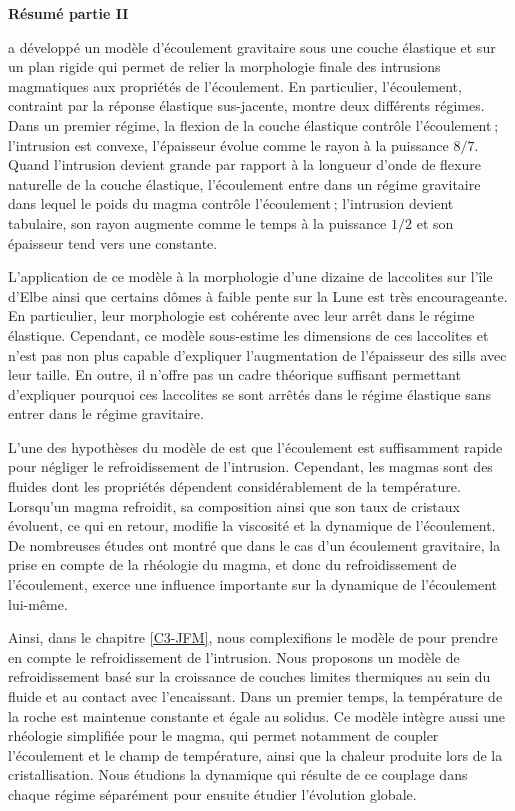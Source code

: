 \thispagestyle{plain}
\begin{flushleft}
 \Large \vspace{.5cm} \textbf{Résumé partie II}
\end{flushleft}

\citet{Michaut:2011kg} a développé un modèle d’écoulement gravitaire
sous une couche élastique et sur un plan rigide qui permet de relier
la morphologie finale des intrusions magmatiques aux propriétés de
l’écoulement. En particulier, l’écoulement, contraint par la réponse
élastique sus-jacente, montre deux différents régimes. Dans un premier
régime, la flexion de la couche élastique contrôle l’écoulement ;
l’intrusion est convexe, l’épaisseur évolue comme le rayon à la
puissance $8/7$. Quand l’intrusion devient grande par rapport à la
longueur d’onde de flexure naturelle de la couche élastique,
l’écoulement entre dans un régime gravitaire dans lequel le poids du
magma contrôle l’écoulement ; l’intrusion devient tabulaire, son rayon
augmente comme le temps à la puissance $1/2$ et son épaisseur tend
vers une constante.

L’application  de  ce  modèle  à   la  morphologie  d’une  dizaine  de
laccolites sur  l’île d’Elbe ainsi  que certains dômes à  faible pente
sur la Lune  est très encourageante. En  particulier, leur morphologie
est cohérente avec leur arrêt  dans le régime élastique. Cependant, ce
modèle sous-estime les  dimensions de ces laccolites et  n’est pas non
plus capable d’expliquer l’augmentation  de l’épaisseur des sills avec
leur taille.  En outre,  il n’offre pas  un cadre  théorique suffisant
permettant d’expliquer pourquoi ces laccolites se sont arrêtés dans le
régime élastique sans entrer dans le régime gravitaire.

L’une des hypothèses du modèle de \citet{Michaut:2011kg} est que
l’écoulement est suffisamment rapide pour négliger le refroidissement
de l’intrusion. Cependant, les magmas sont des fluides dont les
propriétés dépendent considérablement de la température. Lorsqu’un
magma refroidit, sa composition ainsi que son taux de cristaux
évoluent, ce qui en retour, modifie la viscosité et la dynamique de
l’écoulement. De nombreuses études ont montré que dans le cas d’un
écoulement gravitaire, la prise en compte de la rhéologie du magma, et
donc du refroidissement de l’écoulement, exerce une influence
importante sur la dynamique de l’écoulement lui-même.

Ainsi, dans le chapitre \ref{C3-JFM}, nous complexifions le modèle de
\citet{Michaut:2011kg} pour prendre en compte le refroidissement de
l’intrusion. Nous proposons un modèle de refroidissement basé sur la
croissance de couches limites thermiques au sein du fluide et au
contact avec l'encaissant. Dans un premier temps, la température de la
roche est maintenue constante et égale au solidus. Ce modèle intègre
aussi une rhéologie simplifiée pour le magma, qui permet notamment de
coupler l’écoulement et le champ de température, ainsi que la chaleur
produite lors de la cristallisation. Nous étudions la dynamique qui
résulte de ce couplage dans chaque régime séparément pour ensuite
étudier l’évolution globale.

